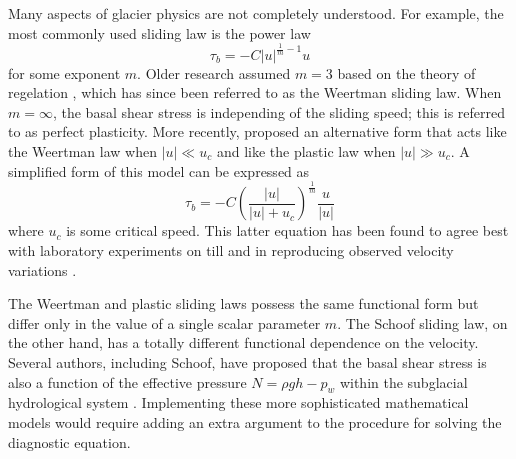 \documentclass[journal abbreviation, manuscript]{copernicus}
\begin{document}
Many aspects of glacier physics are not completely understood.
For example, the most commonly used sliding law is the power law
\begin{equation}
    \tau_b = -C|u|^{\frac{1}{m} - 1}u
    \label{eq:weertman-sliding}
\end{equation}
for some exponent $m$.
Older research assumed $m = 3$ based on the theory of regelation \citep{weertman1957sliding}, which has since been referred to as the Weertman sliding law.
When $m = \infty$, the basal shear stress is independing of the sliding speed; this is referred to as perfect plasticity.
More recently, \citet{schoof2005effect} proposed an alternative form that acts like the Weertman law when $|u| \ll u_c$ and like the plastic law when $|u| \gg u_c$.
A simplified form of this model can be expressed as
\begin{equation}
    \tau_b = -C\left(\frac{|u|}{|u| + u_c}\right)^{\frac{1}{m}}\frac{u}{|u|}
\end{equation}
where $u_c$ is some critical speed.
This latter equation has been found to agree best with laboratory experiments on till \citep{zoet2020slip} and in reproducing observed velocity variations \citep{joughin2019regularized}.

The Weertman and plastic sliding laws possess the same functional form but differ only in the value of a single scalar parameter $m$.
The Schoof sliding law, on the other hand, has a totally different functional dependence on the velocity.
Several authors, including Schoof, have proposed that the basal shear stress is also a function of the effective pressure $N = \rho gh - p_w$ within the subglacial hydrological system \citep{budd1979empirical, schoof2005effect}.
Implementing these more sophisticated mathematical models would require adding an extra argument to the procedure for solving the diagnostic equation.
\end{document}
